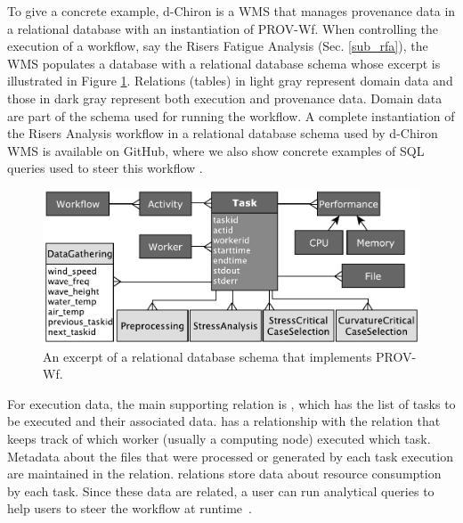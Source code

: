 To give a concrete example, d-Chiron \cite{Souza2015Parallel} is a WMS that manages provenance data in a relational database with an instantiation of PROV-Wf.
When controlling the execution of a workflow,
say the Risers Fatigue Analysis (Sec. \ref{sub_rfa}),
the WMS populates a database with a relational database schema whose excerpt is illustrated in Figure \ref{fig:prov_rfa_dataschema}.
Relations (tables) in
light gray represent domain data and those in dark gray represent both
execution and provenance data. Domain data are part of the schema used for running the workflow.
A complete instantiation of the Risers Analysis workflow in a relational database
schema used by d-Chiron WMS is available on GitHub, where we also show concrete examples of SQL queries used to steer this workflow
\cite{d-ChironGitHub}.

\begin{figure}
    \centering
    \includegraphics[width=\textwidth,keepaspectratio]{img/dchiron-data-model.pdf}
    \caption{An excerpt of a relational database schema that implements PROV-Wf.}
    \label{fig:prov_rfa_dataschema}
\end{figure}


For execution data, the main supporting relation is ,
which has the list of tasks to be executed and their associated data.
 has a
relationship with the  relation that keeps track of which worker
(usually a computing node) executed which task.
Metadata about the files
that were processed or generated by each task execution are maintained
in the  relation.  relations store data about resource
consumption by each task.
Since  these data are related, a user can run analytical queries to
help users to steer the workflow
at runtime~\cite{Souza2017Data,Dias2015Data-centric,DeOliveira2015How,silva_adding_2018,Souza2015Monitoramento}.
